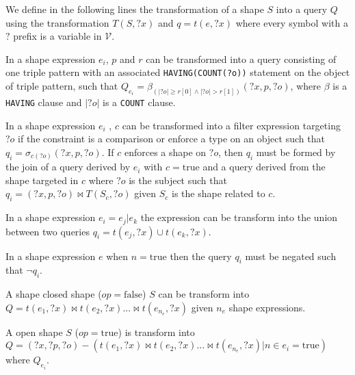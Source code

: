 We define in the following lines the transformation of a shape $S$ into a query $Q$ using the transformation $T(S,?x)$ and $q = t(e, ?x)$ where every 
symbol with a $?$ prefix is a variable in $\mathcal{V}$. 


\iffalse
INSPIRE YOURSELF BY Corman2019 style

!!add having count in the query definition for the cardinalities!!
https://www.w3.org/TR/sparql11-query\#sparqlHavingClause
\fi

\begin{prop}\label{prop:triplePattern}
   In a shape expression $e_i$, $p$ and $r$ can be transformed into a query consisting of one triple pattern with an associated \texttt{HAVING(COUNT(?o))} statement on the object of triple pattern,
   such that $Q_{e_i} = \beta_{(|?o| \geq r[0] \land |?o| > r[1])}(?x, p, ?o)$, where $\beta$ is a \texttt{HAVING} clause and $|?o|$ is a \texttt{COUNT} clause. 
\end{prop}

\begin{prop}
   In a shape expression $e_i$ , $c$ can be transformed into a filter expression targeting $?o$ if the constraint is a comparison or enforce a type on an object such that
   $q_{i} = \sigma_{c(?o)}(?x, p, ?o)$. 
   If $c$ enforces a shape on $?o$, then $q_i$ must be formed by the join of a query derived by $e_i$ with $c = \mathrm{true}$ and a query derived from the shape targeted in $c$ where $?o$ is the subject 
   such that $q_{i}= (?x, p, ?o) \bowtie T(S_c,?o)$ given $S_c$ is the shape related to $c$.
\end{prop}

\begin{prop}
   In a shape expression $e_i = e_j|e_k$ the expression can be transform into the union between two queries
   $q_{i} = t(e_j, ?x) \cup t(e_k, ?x)$.
\end{prop}

\begin{prop}
   In a shape expression $e$ when $n= \mathrm{true}$ then the query $q_i$ must be negated such that $\neg q_i$.
\end{prop}

\begin{prop}
   A shape closed shape ($op = \mathrm{false}$) $S$ can be transform into $Q = t(e_1, ?x) \bowtie t(e_2, ?x) ... \bowtie t(e_{n_e}, ?x)$ given $n_e$ shape expressions.
\end{prop}

\begin{prop}
   A open shape $S$ ($op = \mathrm{true}$) is transform into $Q = (?x, ?p, ?o) -  (t(e_1, ?x) \bowtie  t(e_2, ?x) ... \bowtie t(e_{n_e}, ?x)| n\in e_i = \mathrm{true}) $ where $Q_{e_i}$.
\end{prop}


